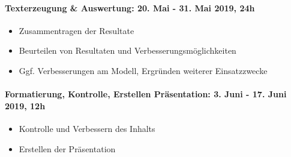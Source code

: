 \paragraph{Texterzeugung \& Auswertung: 20. Mai - 31. Mai 2019, 24h}
\begin{itemize}
    \item Zusammentragen der Resultate
    \item Beurteilen von Resultaten und Verbesserungsmöglichkeiten
    \item Ggf. Verbesserungen am Modell, Ergründen weiterer Einsatzzwecke
\end{itemize}

\paragraph{Formatierung, Kontrolle, Erstellen Präsentation: 3. Juni - 17. Juni 2019, 12h}
\begin{itemize}
    \item Kontrolle und Verbessern des Inhalts
    \item Erstellen der Präsentation
\end{itemize}